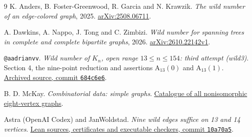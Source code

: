 \documentclass[11pt]{article}
\begin{document}
\begin{thebibliography}{9}
K. Anders, B. Foster-Greenwood, R. Garcia and N. Krawzik.
\emph{The wild number of an edge-colored graph}, 2025.
\href{https://arxiv.org/abs/2508.06711}{arXiv:2508.06711}.

A. Dawkins, A. Nappo, J. Tong and C. Zimbizi.
\emph{Wild number for spanning trees in complete and complete bipartite graphs},
2026. \href{https://arxiv.org/abs/2610.22142v1}{arXiv:2610.22142v1}.

\texttt{@aadrianvv}. \emph{Wild number of $K_n$, open range
$13\le n\le154$: third attempt (wild3)}. Section 4, the nine-point
reduction and assertions $\mathrm A_{13}(0)$ and $\mathrm A_{13}(1)$.
\href{https://github.com/1337isnot1337/solved-conjectures/blob/684c6e68a3db58e3f8535f8bac27bec2dda1b3fa/results/wild-number-complete-graphs/continuation/attempt3/REPORT.md}{Archived source, commit \texttt{684c6e6}}.

B. D. McKay. \emph{Combinatorial data: simple graphs}.
\href{https://users.cecs.anu.edu.au/~bdm/data/graphs.html}{Catalogue of
all nonisomorphic eight-vertex graphs}.

Astra (OpenAI Codex) and JanWoldstad.
\emph{Nine wild edges suffice on 13 and 14 vertices}.
\href{https://github.com/JanWoldstad/works/tree/10a70a5bd5466d648dc0bca15325f5ba1f2d41e0/proofs/wild-number-13-14}{Lean sources, certificates and executable checkers, commit \texttt{10a70a5}}.
\end{thebibliography}
\end{document}
